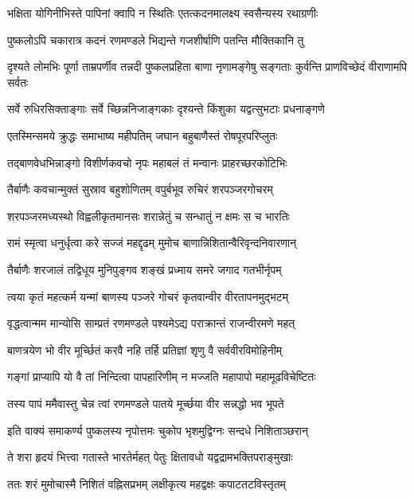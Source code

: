 \twolineshloka
{भक्षिता योगिनीभिस्ते पापिनां क्वापि न स्थितिः}
{एतत्कदनमालक्ष्य स्वसैन्यस्य रथाग्रणीः}%

\twolineshloka
{पुष्कलोऽपि चकारात्र कदनं रणमण्डले}
{भिद्यन्ते गजशीर्षाणि पतन्ति मौक्तिकानि तु}%


\threelineshloka
{दृश्यते लोमभिः पूर्णा ताम्रपर्णीव तन्नदी}
{पुष्कलप्रहिता बाणा नृणामङ्गेषु सङ्गताः}
{कुर्वन्ति प्राणविच्छेदं वीराणामपि सर्वतः}%

\twolineshloka
{सर्वे रुधिरसिक्ताङ्गाः सर्वे च्छिन्ननिजाङ्गकाः}
{दृश्यन्ते किंशुका यद्वत्सुभटाः प्रधनाङ्गणे}%

\twolineshloka
{एतस्मिन्समये क्रुद्धः समाभाष्य महीपतिम्}
{जघान बहुबाणैस्तं रोषपूरपरिप्लुतः}%

\twolineshloka
{तद्बाणवेधभिन्नाङ्गो विशीर्णकवचो नृपः}
{महाबलं तं मन्वानः प्राहरच्छरकोटिभिः}%

\twolineshloka
{तैर्बाणैः कवचान्मुक्तं सुस्राव बहुशोणितम्}
{वपुर्बभूव रुचिरं शरपञ्जरगोचरम्}%

\twolineshloka
{शरपञ्जरमध्यस्थो विह्वलीकृतमानसः}
{शरान्नेतुं च सन्धातुं न क्षमः स च भारतिः}%

\twolineshloka
{रामं स्मृत्वा धनुर्धृत्वा करे सज्जं महद्दृढम्}
{मुमोच बाणान्निशितान्वैरिवृन्दनिवारणान्}%

\twolineshloka
{तैर्बाणैः शरजालं तद्विधूय मुनिपुङ्गव}
{शङ्खं प्रध्माय समरे जगाद गतभीर्नृपम्}%


\twolineshloka
{त्वया कृतं महत्कर्म यन्मां बाणस्य पञ्जरे}
{गोचरं कृतवान्वीर वीरतापनमुद्भटम्}%

\twolineshloka
{वृद्धत्वान्मम मान्योसि साम्प्रतं रणमण्डले}
{पश्यमेऽद्य पराक्रान्तं राजन्वीरमणे महत्}%

\twolineshloka
{बाणत्रयेण भो वीर मूर्च्छितं करवै नहि}
{तर्हि प्रतिज्ञां शृणु वै सर्ववीरविमोहिनीम्}%

\twolineshloka
{गङ्गां प्राप्यापि यो वै तां निन्दित्वा पापहारिणीम्}
{न मज्जति महापापो महामूढविचेष्टितः}%

\twolineshloka
{तस्य पापं ममैवास्तु चेन्न त्वां रणमण्डले}
{पातये मूर्च्छया वीर सन्नद्धो भव भूपते}%

\twolineshloka
{इति वाक्यं समाकर्ण्य पुष्कलस्य नृपोत्तमः}
{चुकोप भृशमुद्विग्नः सन्दधे निशिताञ्छरान्}%

\twolineshloka
{ते शरा हृदयं भित्त्वा गतास्ते भारतेर्महत्}
{पेतुः क्षितावधो यद्वद्रामभक्तिपराङ्मुखाः}%

\twolineshloka
{ततः शरं मुमोचास्मै निशितं वह्निसप्रभम्}
{लक्षीकृत्य महद्वक्षः कपाटतटविस्तृतम्}%

